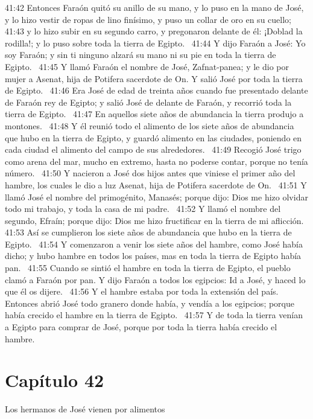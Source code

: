 41:42 Entonces Faraón quitó su anillo de su mano, y lo puso en la mano de José, y lo hizo vestir de ropas de lino finísimo, y puso un collar de oro en su cuello;  
41:43 y lo hizo subir en su segundo carro, y pregonaron delante de él: ¡Doblad la rodilla!; y lo puso sobre toda la tierra de Egipto.  
41:44 Y dijo Faraón a José: Yo soy Faraón; y sin ti ninguno alzará su mano ni su pie en toda la tierra de Egipto.  
41:45 Y llamó Faraón el nombre de José, Zafnat-panea; y le dio por mujer a Asenat, hija de Potifera sacerdote de On. Y salió José por toda la tierra de Egipto.  
41:46 Era José de edad de treinta años cuando fue presentado delante de Faraón rey de Egipto; y salió José de delante de Faraón, y recorrió toda la tierra de Egipto.  
41:47 En aquellos siete años de abundancia la tierra produjo a montones.  
41:48 Y él reunió todo el alimento de los siete años de abundancia que hubo en la tierra de Egipto, y guardó alimento en las ciudades, poniendo en cada ciudad el alimento del campo de sus alrededores.  
41:49 Recogió José trigo como arena del mar, mucho en extremo, hasta no poderse contar, porque no tenía número.  
41:50 Y nacieron a José dos hijos antes que viniese el primer año del hambre, los cuales le dio a luz Asenat, hija de Potifera sacerdote de On.  
41:51 Y llamó José el nombre del primogénito, Manasés; porque dijo: Dios me hizo olvidar todo mi trabajo, y toda la casa de mi padre.  
41:52 Y llamó el nombre del segundo, Efraín; porque dijo: Dios me hizo fructificar en la tierra de mi aflicción. 
41:53 Así se cumplieron los siete años de abundancia que hubo en la tierra de Egipto.  
41:54 Y comenzaron a venir los siete años del hambre, como José había dicho; y hubo hambre en todos los países, mas en toda la tierra de Egipto había pan.  
41:55 Cuando se sintió el hambre en toda la tierra de Egipto, el pueblo clamó a Faraón por pan. Y dijo Faraón a todos los egipcios: Id a José, y haced lo que él os dijere.  
41:56 Y el hambre estaba por toda la extensión del país. Entonces abrió José todo granero donde había, y vendía a los egipcios; porque había crecido el hambre en la tierra de Egipto.  
41:57 Y de toda la tierra venían a Egipto para comprar de José, porque por toda la tierra había crecido el hambre.  
\section*{Capítulo 42}
Los hermanos de José vienen por alimentos  

